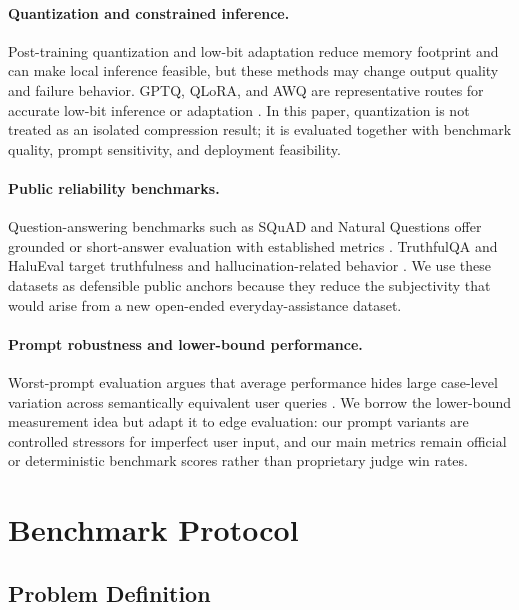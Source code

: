 \documentclass[letterpaper]{article}
\begin{document}
\paragraph{Quantization and constrained inference.}
Post-training quantization and low-bit adaptation reduce memory footprint and can make local inference feasible, but these methods may change output quality and failure behavior. GPTQ, QLoRA, and AWQ are representative routes for accurate low-bit inference or adaptation \citep{frantar2023gptq,dettmers2023qlora,lin2024awq}. In this paper, quantization is not treated as an isolated compression result; it is evaluated together with benchmark quality, prompt sensitivity, and deployment feasibility.

\paragraph{Public reliability benchmarks.}
Question-answering benchmarks such as SQuAD and Natural Questions offer grounded or short-answer evaluation with established metrics \citep{rajpurkar2016squad,kwiatkowski2019natural}. TruthfulQA and HaluEval target truthfulness and hallucination-related behavior \citep{lin2022truthfulqa,li2023halueval}. We use these datasets as defensible public anchors because they reduce the subjectivity that would arise from a new open-ended everyday-assistance dataset.

\paragraph{Prompt robustness and lower-bound performance.}
Worst-prompt evaluation argues that average performance hides large case-level variation across semantically equivalent user queries \citep{cao2024worstprompt}. We borrow the lower-bound measurement idea but adapt it to edge evaluation: our prompt variants are controlled stressors for imperfect user input, and our main metrics remain official or deterministic benchmark scores rather than proprietary judge win rates.

\section{Benchmark Protocol}

\subsection{Problem Definition}
\end{document}
